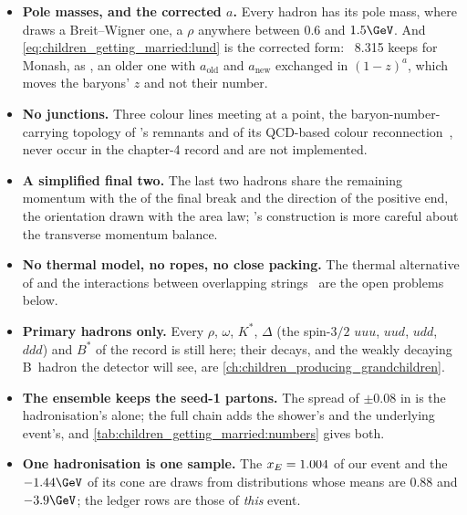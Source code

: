 \begin{itemize}
    $q_{\mathrm{last}}$ the flavour about to be made, so that our strings
    of $2.05$ and $2.17\GeV$ always make three hadrons here and, as a
    rule, two there.
  \item \textbf{Pole masses, and the corrected $a$.} Every hadron has its
    pole mass, where \PYTHIA draws a Breit--Wigner one, a $\rho$ anywhere
    between $0.6$ and $1.5\GeV$. And
    \cref{eq:children_getting_married:lund} is the corrected form:
    \PYTHIA~8.315 keeps for Monash, as , an
    older one with $a_{\mathrm{old}}$ and $a_{\mathrm{new}}$ exchanged in
    $(1-z)^a$, which moves the baryons' $z$ and not their number.
  \item \textbf{No junctions.} Three colour lines meeting at a point, the
    baryon-number-carrying topology of \PYTHIA's remnants and of its
    QCD-based colour reconnection~\cite{Sjostrand:2002ip,Christiansen:2015yqa},
    never occur in the chapter-4 record and are not implemented.
  \item \textbf{A simplified final two.} The last two hadrons share the
    remaining momentum with the \pt of the final break and the direction
    of the positive end, the orientation drawn with the area law; \PYTHIA's
    construction is more careful about the transverse momentum balance.
  \item \textbf{No thermal model, no ropes, no close packing.} The thermal
    \pt alternative of \cite{Fischer:2016zzs} and the interactions between
    overlapping strings~\cite{Bierlich:2014xba} are the open problems below.
  \item \textbf{Primary hadrons only.} Every $\rho$, $\omega$, $K^*$,
    $\Delta$ (the spin-$3/2$ $uuu$, $uud$, $udd$, $ddd$) and $B^*$ of the
    record is still here; their decays, and the
    weakly decaying B~hadron the detector will see, are
    \cref{ch:children_producing_grandchildren}.
  \item \textbf{The ensemble keeps the seed-1 partons.} The spread of
    $\pm0.08$ in \xE is the hadronisation's alone; the full chain adds the
    shower's and the underlying event's, and \cref{tab:children_getting_married:numbers}
    gives both.
  \item \textbf{One hadronisation is one sample.} The $x_E=1.004$ of our
    event and the $-1.44\GeV$ of its cone are draws from distributions whose
    means are $0.88$ and $-3.9\GeV$; the ledger rows are those of
    \emph{this} event.
\end{itemize}

